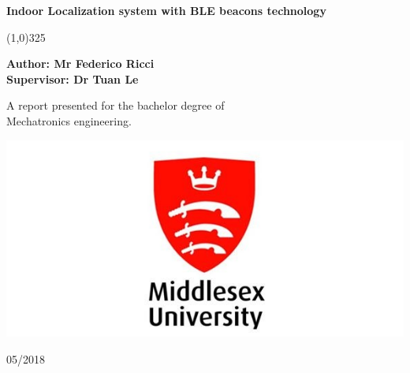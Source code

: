 \documentclass[12]{report}
\begin{document}
	
	\begin{titlepage}
		
		\begin{center}
			\vspace*{0.5cm}			
			\Huge
			\textbf{Indoor Localization system with BLE beacons technology}		
			
			\begin{center}
				\line(1,0){325}	
			\end{center}			
		
			\vspace{0.5cm}
			
			\Large		
			\textbf{Author: Mr Federico Ricci}\\
			\textbf{Supervisor: Dr Tuan Le}	
			
			\vfill		
			A report presented for the bachelor degree of\\
			Mechatronics engineering.\\	
			
			\vspace{0.8cm}		
			
			\includegraphics[width=1.0\textwidth]{middlesex}
			
			\vspace{0.8cm}
						
			\Large


			\vspace{0.25cm}
			05/2018
			
		\end{center}
		\newpage
		\thispagestyle{empty}
		\mbox{}
	\end{titlepage}

	
	

	
	
	\tableofcontents
	\newpage
	
	
	
	
	
	
\end{document}
